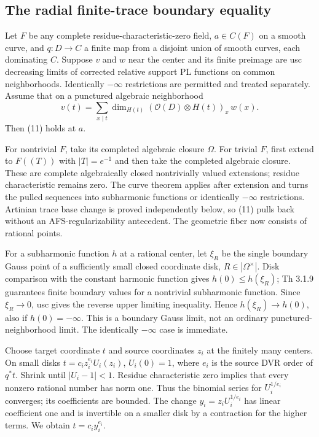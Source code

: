 \documentclass[
  11pt,
]{article}
\begin{document}
\subsection{The radial finite-trace boundary
equality}\label{the-radial-finite-trace-boundary-equality}

Let \(F\) be any complete residue-characteristic-zero field,
\(a\in C(F)\) on a smooth curve, and \(q:D\to C\) a finite map from a
disjoint union of smooth curves, each dominating \(C\). Suppose \(v\)
and \(w\) near the center and its finite preimage are usc decreasing
limits of corrected relative support PL functions on common
neighborhoods. Identically \(-\infty\) restrictions are permitted and
treated separately. Assume that on a punctured algebraic neighborhood
\[v(t)=\sum_{x\mid t}\dim_{H(t)}(\mathcal O(D)\otimes H(t))_x\,w(x).     \tag{11}\]
Then (11) holds at \(a\).

For nontrivial \(F\), take its completed algebraic closure \(\Omega\).
For trivial \(F\), first extend to \(F((T))\) with \(|T|=e^{-1}\) and
then take the completed algebraic closure. These are complete
algebraically closed nontrivially valued extensions; residue
characteristic remains zero. The curve theorem applies after extension
and turns the pulled sequences into subharmonic functions or identically
\(-\infty\) restrictions. Artinian trace base change is proved
independently below, so (11) pulls back without an AFS-regularizability
antecedent. The geometric fiber now consists of rational points.

For a subharmonic function \(h\) at a rational center, let \(\xi_R\) be
the single boundary Gauss point of a sufficiently small closed
coordinate disk, \(R\in|\Omega^\times|\). Disk comparison with the
constant harmonic function gives \(h(0)\le h(\xi_R)\); Th 3.1.9
guarantees finite boundary values for a nontrivial subharmonic function.
Since \(\xi_R\to0\), usc gives the reverse upper limiting inequality.
Hence \(h(\xi_R)\to h(0)\), also if \(h(0)=-\infty\). This is a boundary
Gauss limit, not an ordinary punctured-neighborhood limit. The
identically \(-\infty\) case is immediate.

Choose target coordinate \(t\) and source coordinates \(z_i\) at the
finitely many centers. On small disks \(t=c_i z_i^{e_i}U_i(z_i)\),
\(U_i(0)=1\), where \(e_i\) is the source DVR order of \(q^*t\). Shrink
until \(|U_i-1|<1\). Residue characteristic zero implies that every
nonzero rational number has norm one. Thus the binomial series for
\(U_i^{1/e_i}\) converges; its coefficients are bounded. The change
\(y_i=z_iU_i^{1/e_i}\) has linear coefficient one and is invertible on a
smaller disk by a contraction for the higher terms. We obtain
\(t=c_i y_i^{e_i}\).
\end{document}
